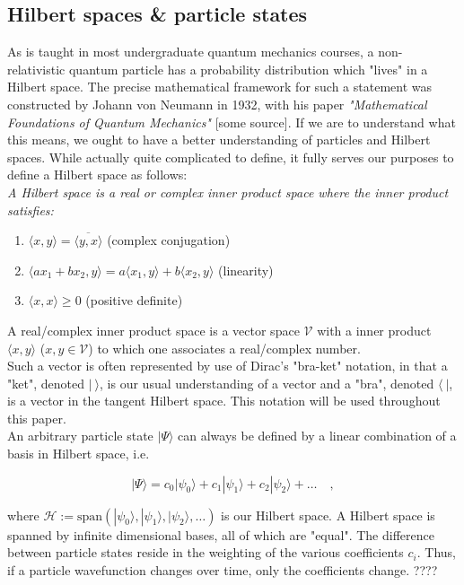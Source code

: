 \documentclass[10pt]{report}
\begin{document}
	\subsection{Hilbert spaces \& particle states}
	As is taught in most undergraduate quantum mechanics courses, a non-relativistic quantum particle has a probability distribution which "lives" in a Hilbert space. The precise mathematical framework for such a statement was constructed by Johann von Neumann in 1932, with his paper \emph{"Mathematical Foundations of Quantum Mechanics"} [some source]. If we are to understand what this means, we ought to have a better understanding of particles and Hilbert spaces. While actually quite complicated to define, it fully serves our purposes to define a Hilbert space as follows:\\
	
	\emph{A Hilbert space is a real or complex inner product space where the inner product satisfies:}
	\begin{enumerate}
		\item $\langle x,y\rangle = \overbar{\langle y,x\rangle}$ (complex conjugation)
		\item $\langle ax_1 + bx_2,y\rangle = a\langle x_1,y\rangle + b\langle x_2,y\rangle$ (linearity)
		\item $\langle x,x\rangle \geq 0$ (positive definite)
	\end{enumerate}
	
	A real/complex inner product space is a vector space $\mathcal{V}$ with a inner product $\langle x,y\rangle$ ($x,y \in \mathcal{V}$) to which one associates a real/complex number.\\
	
	
	
	Such a vector is often represented by use of Dirac's "bra-ket" notation, in that a "ket", denoted $|\:\rangle$, is our usual understanding of a vector and a "bra", denoted $\langle\:|$, is a vector in the tangent Hilbert space. This notation will be used throughout this paper.\\
	An arbitrary particle state $|\Psi\rangle$ can always be defined by a linear combination of a basis in Hilbert space, i.e.
	
	\begin{equation}
		|\Psi\rangle = c_0|\psi_0\rangle + c_1|\psi_1\rangle + c_2|\psi_2\rangle + \ldots \quad,
	\end{equation}
	
	where $\mathcal{H} := \text{span}(|\psi_0\rangle,|\psi_1\rangle,|\psi_2\rangle,\ldots)$ is our Hilbert space. A Hilbert space is spanned by infinite dimensional bases, all of which are "equal". The difference between particle states reside in the weighting of the various coefficients $c_i$. Thus, if a particle wavefunction changes over time, only the coefficients change. ????
	
\end{document}
